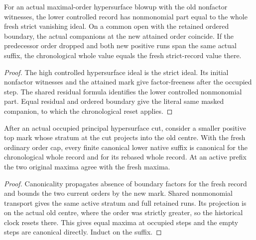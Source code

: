 \begin{theorem}
\label{hir:g8-occupied-principal-residual}
\leanok
For an actual maximal-order hypersurface blowup with the
old nonfactor witnesses, the lower controlled record has
nonmonomial part equal to the whole fresh strict vanishing
ideal. On a common open with the retained ordered boundary,
the actual companions at the new attained order coincide.
If the predecessor order dropped and both new positive runs
span the same actual suffix, the chronological whole value
equals the fresh strict-record value there.
\end{theorem}
\begin{proof}
The high controlled hypersurface ideal is the strict ideal.
Its initial nonfactor witnesses and the attained mark give
factor-freeness after the occupied step. The shared residual
formula identifies the lower controlled nonmonomial part.
Equal residual and ordered boundary give the literal same
masked companion, to which the chronological reset applies.
\end{proof}

\begin{theorem}
\label{hir:g8-occupied-principal-retained-restart}
\leanok
After an actual occupied principal hypersurface cut, consider
a smaller positive top mark whose stratum at the cut projects
into the old centre. With the fresh ordinary order cap, every
finite canonical lower native suffix is canonical for the
chronological whole record and for its rebased whole record.
At an active prefix the two original maxima agree with the
fresh maxima.
\end{theorem}
\begin{proof}
Canonicality propagates absence of boundary factors for the
fresh record and bounds the two current orders by the new mark.
Shared nonmonomial transport gives the same active stratum and
full retained runs. Its projection is on the actual old centre,
where the order was strictly greater, so the historical clock
resets there. This gives equal maxima at occupied steps and
the empty steps are canonical directly. Induct on the suffix.
\end{proof}

